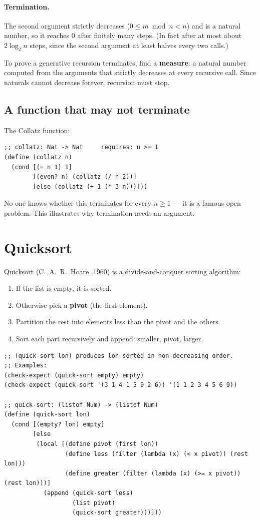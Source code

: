 \paragraph{Termination.} The second argument strictly decreases
($0 \le m \bmod n < n$) and is a natural number, so it reaches 0 after finitely
many steps. (In fact after at most about $2\log_2 n$ steps, since the second
argument at least halves every two calls.)

\begin{important}
To prove a generative recursion terminates, find a \textbf{measure}: a
natural number computed from the arguments that strictly decreases at every
recursive call. Since naturals cannot decrease forever, recursion must stop.
\end{important}

\subsection{A function that may not terminate}
The Collatz function:
\begin{lstlisting}[style=racket]
;; collatz: Nat -> Nat     requires: n >= 1
(define (collatz n)
  (cond [(= n 1) 1]
        [(even? n) (collatz (/ n 2))]
        [else (collatz (+ 1 (* 3 n)))]))
\end{lstlisting}
No one knows whether this terminates for every $n \ge 1$ --- it is a famous
open problem. This illustrates why termination needs an argument.

\section{Quicksort}
Quicksort (C.~A.~R.~Hoare, 1960) is a divide-and-conquer sorting algorithm:
\begin{enumerate}
  \item If the list is empty, it is sorted.
  \item Otherwise pick a \textbf{pivot} (the first element).
  \item Partition the rest into elements less than the pivot and the others.
  \item Sort each part recursively and append: smaller, pivot, larger.
\end{enumerate}

\begin{lstlisting}[style=racket]
;; (quick-sort lon) produces lon sorted in non-decreasing order.
;; Examples:
(check-expect (quick-sort empty) empty)
(check-expect (quick-sort '(3 1 4 1 5 9 2 6)) '(1 1 2 3 4 5 6 9))

;; quick-sort: (listof Num) -> (listof Num)
(define (quick-sort lon)
  (cond [(empty? lon) empty]
        [else
         (local [(define pivot (first lon))
                 (define less (filter (lambda (x) (< x pivot)) (rest lon)))
                 (define greater (filter (lambda (x) (>= x pivot)) (rest lon)))]
           (append (quick-sort less)
                   (list pivot)
                   (quick-sort greater)))]))
\end{lstlisting}

